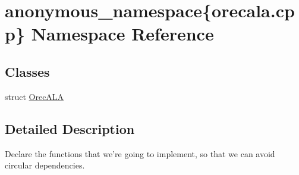 \hypertarget{namespaceanonymous__namespace_02orecala_8cpp_03}{\section{anonymous\-\_\-namespace\{orecala.\-cpp\} Namespace Reference}
\label{namespaceanonymous__namespace_02orecala_8cpp_03}
}
\subsection*{Classes}
\begin{DoxyCompactItemize}
\item 
struct \hyperlink{structanonymous__namespace_02orecala_8cpp_03_1_1OrecALA}{Orec\-A\-L\-A}
\end{DoxyCompactItemize}


\subsection{Detailed Description}
Declare the functions that we're going to implement, so that we can avoid circular dependencies. 